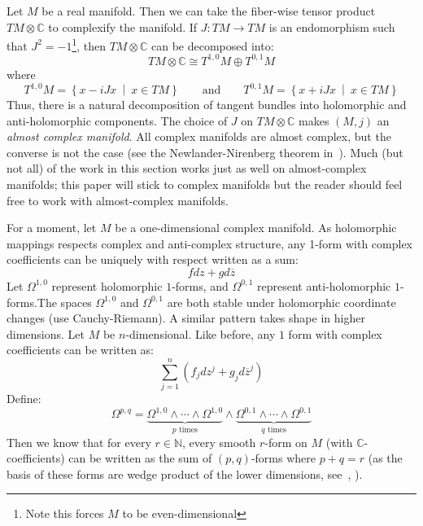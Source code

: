 \documentclass{ut-thesis}
\newcommand{\N}{{\mathbb{N}}}
\newcommand{\C}{{\mathbb{C}}}
\newcommand{\set}[2]{\left\{#1 \ \middle|\ #2\right\}}
\begin{document}
Let $M$ be a real manifold. Then we can take the fiber-wise tensor product $TM\otimes \C$ to complexify the
manifold. If $J: TM \to TM$ is an endomorphism such that $J^2 = -1$\footnote{Note this forces $M$ to be
even-dimensional}, then $TM\otimes \C$ can be decomposed into:
\[
  TM\otimes \C \cong T^{1,0}M \oplus T^{0,1}M
\]
where
\[
  T^{1,0}M = \set{x-iJx}{x \in TM} \qquad \text{and} \qquad T^{0,1}M =\set{x+iJx}{x \in TM}
\]
Thus, there is a natural decomposition of tangent bundles into holomorphic and anti-holomorphic components.
The choice of $J$ on $TM\otimes \C$ makes $(M,j)$ an \emph{almost complex manifold}. All complex manifolds are
almost complex, but the converse is not the case (see the Newlander-Nirenberg theorem
in~\cite{HodgeTheory2014}). Much (but not all) of the work in this section works just as well on almost-complex
manifolds; this paper will stick to complex manifolds but the reader should feel free to work with
almost-complex manifolds.

For a moment, let $M$ be a one-dimensional complex manifold. As holomorphic mappings respects
complex and anti-complex structure, any 1-form with complex coefficients can be uniquely with respect written
as a sum:
\[
   fdz + gd\overline{z}
\]
Let $\Omega^{1,0}$ represent holomorphic $1$-forms, and $\Omega^{0,1}$ represent anti-holomorphic
$1$-forms.The spaces $\Omega^{1,0}$ and $\Omega^{0,1}$ are both stable under holomorphic coordinate
changes (use Cauchy-Riemann). A similar pattern takes shape in higher dimensions. Let $M$ be $n$-dimensional. Like before, any $1$ form with
complex coefficients can be written as:
\[
  \sum_{j=1}^n (f_jdz^{j} + g_jd\overline{z}^j)
\]
Define:
\[
  \Omega^{p,q} = \underbrace{\Omega^{1,0} \wedge \cdots \wedge \Omega^{1,0}}_{\text{$p$ times}}\wedge \underbrace{\Omega^{0,1} \wedge \cdots \wedge \Omega^{0,1}}_{\text{$q$ times}}
\]
Then we know that for every $r \in \N$, every smooth $r$-form on $M$ (with $\C$-coefficients) can be written
as the sum of $(p,q)$-forms where $p+q = r$ (as the basis of these forms are wedge product of the lower
dimensions, see~\cite{NateDiffGeo}, \cite{NateAlgTop}).
\end{document}

